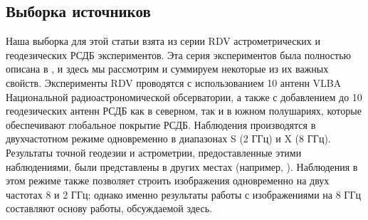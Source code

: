 \subsection{Выборка источников}

Наша выборка для этой статьи взята из серии RDV астрометрических и геодезических РСДБ
экспериментов. Эта серия экспериментов была полностью описана в \cite{Piner_2007}, и здесь мы
рассмотрим и суммируем некоторые из их важных свойств. Эксперименты RDV проводятся с использованием
10 антенн VLBA Национальной радиоастрономической обсерватории, а также с добавлением до 10
геодезических антенн РСДБ как в северном, так и в южном полушариях, которые обеспечивают глобальное
покрытие РСДБ. Наблюдения производятся в двухчастотном режиме одновременно в диапазонах S (2 ГГц) и
X (8 ГГц). Результаты точной геодезии и астрометрии, предоставленные этими наблюдениями, были
представлены в других местах (например, \cite{Petrov_2003,Fey_2004}). Наблюдения в этом режиме
также позволяет строить изображения одновременно на двух частотах 8 и 2 ГГц; однако
именно результаты работы с изображениями на 8 ГГц составляют основу работы, обсуждаемой здесь.

